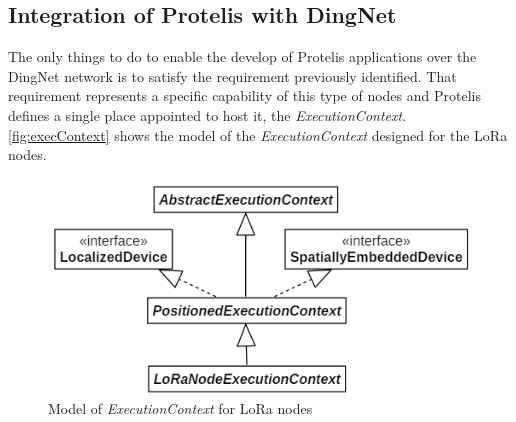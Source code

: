 \subsection{Integration of Protelis with DingNet}
\label{sec:PoverD}
The only things to do to enable the develop of Protelis applications over the DingNet network is to satisfy the requirement previously identified.
That requirement represents a specific capability of this type of nodes and Protelis defines a single place appointed to host it, the \mbox{\textit{ExecutionContext}}.
\autoref{fig:execContext} shows the model of the \mbox{\textit{ExecutionContext}} designed for the LoRa nodes. 

\begin{figure}[h]
    \centering
    \includegraphics{figures/execContext.png}
    \caption{Model of \textit{ExecutionContext} for LoRa nodes}
    \label{fig:execContext}
\end{figure}

